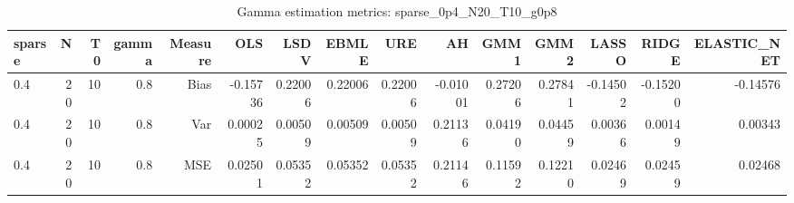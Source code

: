 \begin{table}[!htbp]\centering
\caption{Gamma estimation metrics: sparse_0p4_N20_T10_g0p8}
\label{tab:table1_sparse_0p4_N20_T10_g0p8}
\begin{tabular}{lrrrrrrrrrrrrrr}
\hline
sparse & N & T0 & gamma & Measure & OLS & LSDV & EBMLE & URE & AH & GMM1 & GMM2 & LASSO & RIDGE & ELASTIC_NET \\
\hline
0.4 & 20 & 10 & 0.8 & Bias & -0.15736 & 0.22006 & 0.22006 & 0.22006 & -0.01001 & 0.27206 & 0.27841 & -0.14502 & -0.15200 & -0.14576 \\
0.4 & 20 & 10 & 0.8 & Var & 0.00025 & 0.00509 & 0.00509 & 0.00509 & 0.21136 & 0.04190 & 0.04459 & 0.00366 & 0.00149 & 0.00343 \\
0.4 & 20 & 10 & 0.8 & MSE & 0.02501 & 0.05352 & 0.05352 & 0.05352 & 0.21146 & 0.11592 & 0.12210 & 0.02469 & 0.02459 & 0.02468 \\
\hline
\end{tabular}
\end{table}

